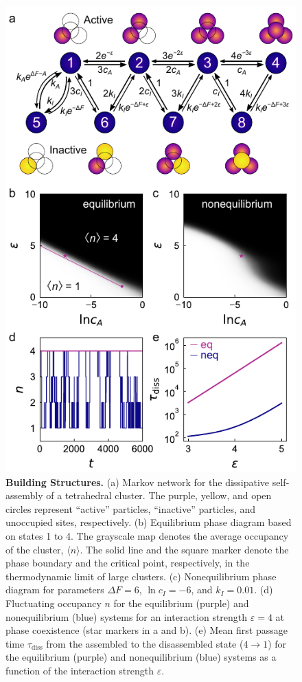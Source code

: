 \begin{appendices}
\begin{figure}[h!]
    \centering
    \includegraphics{figures/A5_BuildingStructures.pdf}
    \caption{\textbf{Building Structures.} (a) Markov network for the dissipative self-assembly of a tetrahedral cluster. The purple, yellow, and open circles represent ``active'' particles, ``inactive'' particles, and unoccupied sites, respectively. (b) Equilibrium phase diagram based on states 1 to 4. The grayscale map denotes the average occupancy of the cluster, $\langle n\rangle$. The solid line and the square marker denote the phase boundary and the critical point, respectively, in the thermodynamic limit of large clusters. (c) Nonequilibrium phase diagram for parameters $\Delta F=6$, $\ln c_I = -6$, and $k_I = 0.01$.  (d) Fluctuating occupancy $n$ for the equilibrium (purple) and nonequilibrium (blue) systems for an interaction strength $\varepsilon=4$ at phase coexistence (star markers in a and b). (e) Mean first passage time $\tau_{\text{diss}}$ from the assembled to the disassembled state ($4\rightarrow1$) for the equilibrium (purple) and nonequilibrium (blue) systems as a function of the interaction strength $\varepsilon$. }
    \label{fig:BuildingStructures}
\end{figure}


\end{appendices}
